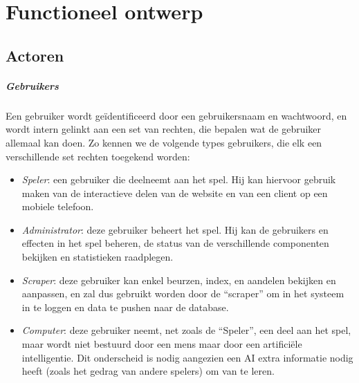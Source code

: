 %
%

\chapter{Functioneel ontwerp}

\section{Actoren}

\paragraph{Gebruikers}Een gebruiker wordt ge\"identificeerd door een gebruikersnaam en wachtwoord, en wordt intern gelinkt aan een set van rechten, die bepalen wat de gebruiker allemaal kan doen. Zo kennen we de volgende types gebruikers, die elk een verschillende set rechten toegekend worden:
\begin{itemize}
	\item{\emph{Speler}: een gebruiker die deelneemt aan het spel. Hij kan hiervoor gebruik maken van de interactieve delen van de website en van een client op een mobiele telefoon.}
	\item{\emph{Administrator}: deze gebruiker beheert het spel. Hij kan de gebruikers en effecten in het spel beheren, de status van de verschillende componenten bekijken en statistieken raadplegen.}
	\item{\emph{Scraper}: deze gebruiker kan enkel beurzen, index, en aandelen bekijken en aanpassen, en zal dus gebruikt worden door de ``scraper'' om in het systeem in te loggen en data te pushen naar de database.}
	\item{\emph{Computer}: deze gebruiker neemt, net zoals de ``Speler'', een deel aan het spel, maar wordt niet bestuurd door een mens maar door een artifici\"ele intelligentie. Dit onderscheid is nodig aangezien een AI extra informatie nodig heeft (zoals het gedrag van andere spelers) om van te leren.}
\end{itemize}


